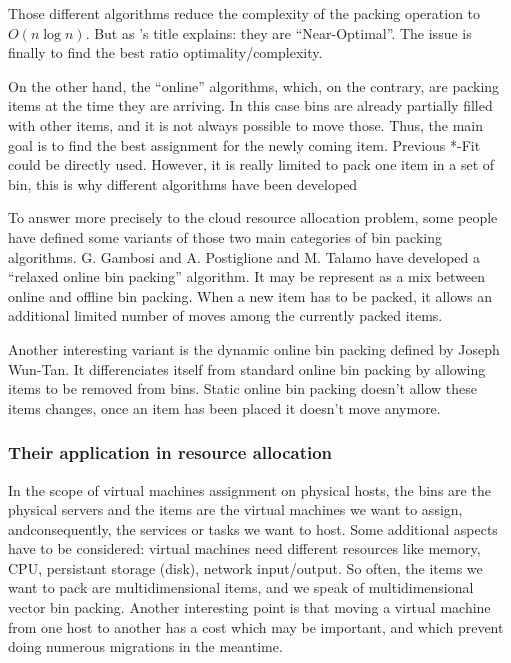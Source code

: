 \documentclass[a4paper,11pt]{article}
\begin{document}
Those different algorithms reduce the complexity of the packing operation to
$O(n\log{n})$. But as \cite{maths:bpheuristics}'s title explains: they are
“Near-Optimal”.  The issue is finally to find the best ratio optimality/complexity.

On the other hand, the “online” algorithms, which, on the contrary, are packing
items at the time they are arriving. In this case bins are already partially
filled with other items, and it is not always possible to move those. Thus, the
main goal is to find the best assignment for the newly coming item. Previous
*-Fit could be directly used. However, it is really limited to pack one item in
a set of bin, this is why different algorithms have been developed

To answer more precisely to the cloud resource allocation problem, some people
have defined some variants of those two main categories of bin packing
algorithms. G. Gambosi and A. Postiglione and M. Talamo have developed a
“relaxed online bin packing” algorithm\cite{maths:relaxedonlinebp}. It may be
represent as a mix between online and offline bin packing. When a new item has
to be packed, it allows an additional limited number of moves among the
currently packed items.

Another interesting variant is the dynamic online bin packing defined by Joseph
Wun-Tan.  It differenciates itself from standard online bin packing by allowing
items to be removed from bins. Static online bin packing doesn't allow these
items changes, once an item has been placed it doesn't move anymore.

\subsubsection{Their application in resource allocation}

In the scope of virtual machines assignment on physical hosts, the bins are the
physical servers and the items are the virtual machines we want to assign,
andconsequently, the services or tasks we want to host. Some additional aspects
have to be considered: virtual machines need different resources like memory,
CPU, persistant storage (disk), network input/output. So often, the items we
want to pack are multidimensional items, and we speak of multidimensional
vector bin packing. Another interesting point is that moving a virtual machine
from one host to another has a cost which may be important, and which prevent 
doing numerous migrations in the meantime.
\end{document}
